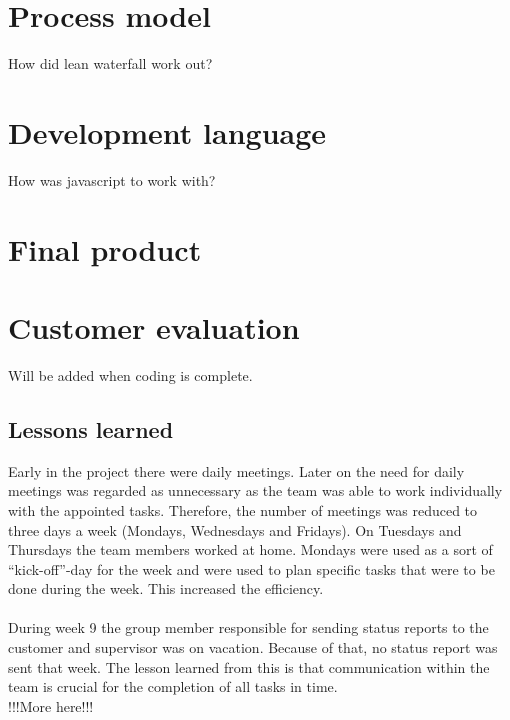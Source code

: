 \section{Process model}

How did lean waterfall work out?

\section{Development language}

How was javascript to work with?

\section{Final product}

\section{Customer evaluation}

Will be added when coding is complete.

\subsection{Lessons learned}

Early in the project there were daily meetings. Later on the need for daily meetings was regarded as unnecessary as the team was able to work individually with the appointed tasks. Therefore, the number of meetings was reduced to three days a week (Mondays, Wednesdays and Fridays). On Tuesdays and Thursdays the team members worked at home. Mondays were used as a sort of “kick-off”-day for the week and were used to plan specific tasks that were to be done during the week. This increased the efficiency.\\
\\
During week 9 the group member responsible for sending status reports to the customer and supervisor was on vacation. Because of that, no status report was sent that week. The lesson learned from this is that communication within the team is crucial for the completion of all tasks in time.\\

!!!More here!!!
